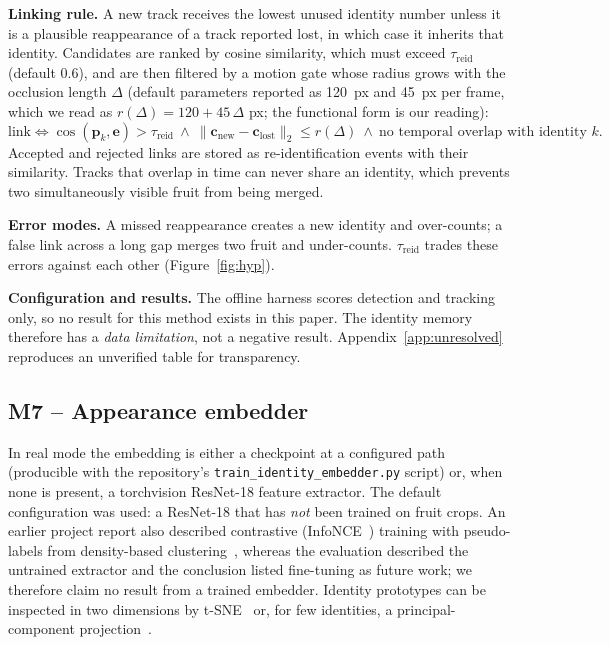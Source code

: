 \documentclass[11pt,a4paper]{article}
\begin{document}
\textbf{Linking rule.} A new track receives the lowest unused identity number unless it is a plausible reappearance of a track reported lost, in which case it inherits that identity. Candidates are ranked by cosine similarity, which must exceed $\tau_{\mathrm{reid}}$ (default 0.6), and are then filtered by a motion gate whose radius grows with the occlusion length $\Delta$ (default parameters reported as 120~px and 45~px per frame, which we read as $r(\Delta)=120+45\,\Delta$ px; the functional form is our reading):
\begin{equation}
\text{link}\iff\cos(\mathbf{p}_k,\mathbf{e})>\tau_{\mathrm{reid}}\ \wedge\ \lVert\mathbf{c}_{\text{new}}-\mathbf{c}_{\text{lost}}\rVert_2\le r(\Delta)\ \wedge\ \text{no temporal overlap with identity }k .\label{eq:link}
\end{equation}
Accepted and rejected links are stored as re-identification events with their similarity. Tracks that overlap in time can never share an identity, which prevents two simultaneously visible fruit from being merged.

\textbf{Error modes.} A missed reappearance creates a new identity and over-counts; a false link across a long gap merges two fruit and under-counts. $\tau_{\mathrm{reid}}$ trades these errors against each other (Figure~\ref{fig:hyp}).

\textbf{Configuration and results.} The offline harness scores detection and tracking only, so no result for this method exists in this paper. The identity memory therefore has a \emph{data limitation}, not a negative result. Appendix~\ref{app:unresolved} reproduces an unverified table for transparency.

\subsection{M7 -- Appearance embedder}
In real mode the embedding is either a checkpoint at a configured path (producible with the repository's \texttt{train\_identity\_embedder.py} script) or, when none is present, a torchvision ResNet-18 feature extractor. The default configuration was used: a ResNet-18 that has \emph{not} been trained on fruit crops. An earlier project report also described contrastive (InfoNCE~\cite{oord2018cpc}) training with pseudo-labels from density-based clustering~\cite{ester1996dbscan}, whereas the evaluation described the untrained extractor and the conclusion listed fine-tuning as future work; we therefore claim no result from a trained embedder. Identity prototypes can be inspected in two dimensions by t-SNE~\cite{vandermaaten2008tsne} or, for few identities, a principal-component projection~\cite{jolliffe2016pca}. 
\end{document}
